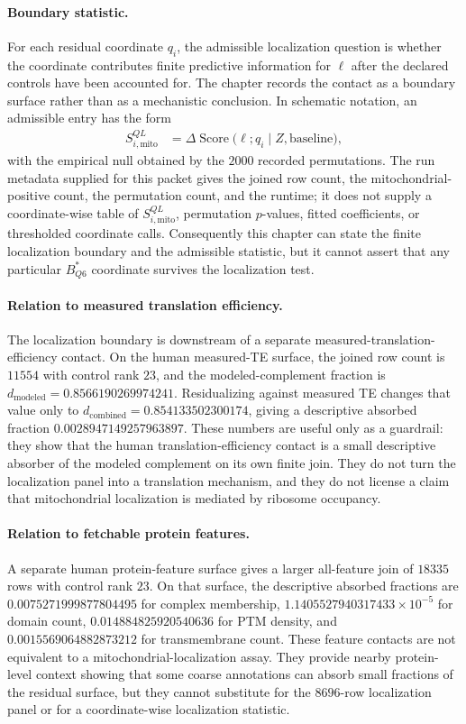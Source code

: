 \paragraph{Boundary statistic.}
For each residual coordinate $q_i$, the admissible localization question is whether the coordinate contributes finite predictive information for $\ell$ after the declared controls have been accounted for.  The chapter records the contact as a boundary surface rather than as a mechanistic conclusion.  In schematic notation, an admissible entry has the form
$$
\begin{aligned}
  S^{QL}_{i,\mathrm{mito}}
    &= \Delta\operatorname{Score}\bigl(\ell; q_i \mid Z, \mathrm{baseline}\bigr),
\end{aligned}
$$
with the empirical null obtained by the $2000$ recorded permutations.  The run metadata supplied for this packet gives the joined row count, the mitochondrial-positive count, the permutation count, and the runtime; it does not supply a coordinate-wise table of $S^{QL}_{i,\mathrm{mito}}$, permutation $p$-values, fitted coefficients, or thresholded coordinate calls.  Consequently this chapter can state the finite localization boundary and the admissible statistic, but it cannot assert that any particular $B^{\ast}_{Q6}$ coordinate survives the localization test.

\paragraph{Relation to measured translation efficiency.}
The localization boundary is downstream of a separate measured-translation-efficiency contact.  On the human measured-TE surface, the joined row count is $11554$ with control rank $23$, and the modeled-complement fraction is $d_{\mathrm{modeled}}=0.8566190269974241$.  Residualizing against measured TE changes that value only to $d_{\mathrm{combined}}=0.854133502300174$, giving a descriptive absorbed fraction $0.0028947149257963897$.  These numbers are useful only as a guardrail: they show that the human translation-efficiency contact is a small descriptive absorber of the modeled complement on its own finite join.  They do not turn the localization panel into a translation mechanism, and they do not license a claim that mitochondrial localization is mediated by ribosome occupancy.

\paragraph{Relation to fetchable protein features.}
A separate human protein-feature surface gives a larger all-feature join of $18335$ rows with control rank $23$.  On that surface, the descriptive absorbed fractions are $0.0075271999877804495$ for complex membership, $1.1405527940317433\times 10^{-5}$ for domain count, $0.014884825920540636$ for PTM density, and $0.0015569064882873212$ for transmembrane count.  These feature contacts are not equivalent to a mitochondrial-localization assay.  They provide nearby protein-level context showing that some coarse annotations can absorb small fractions of the residual surface, but they cannot substitute for the $8696$-row localization panel or for a coordinate-wise localization statistic.

